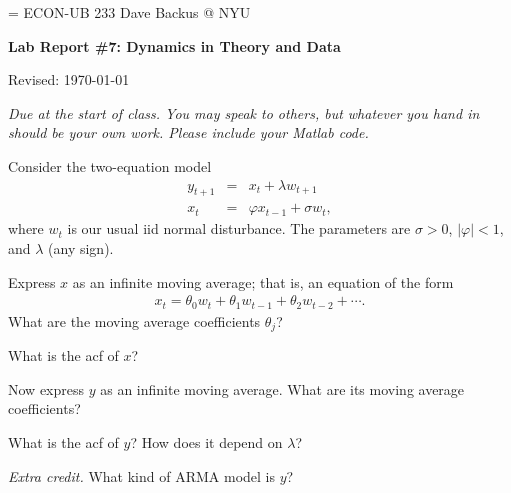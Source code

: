 \documentclass[11pt]{exam}
\begin{document}
\parskip=\bigskipamount
\parindent=0.0in
\thispagestyle{empty}
{\large ECON-UB 233 \hfill Dave Backus @ NYU}

\bigskip\bigskip
\centerline{\Large \bf Lab Report \#7:  Dynamics in Theory and Data}
\centerline{Revised: \today}

\bigskip
{\it Due at the start of class.
You may speak to others, but whatever you hand in should be your own work.
Please include your Matlab code.}


\begin{questions}
Consider the two-equation model
\begin{eqnarray*}
    y_{t+1}   &=&  x_t + \lambda w_{t+1} \\
    x_{t}     &=& \varphi x_{t-1} + \sigma w_{t}  ,
\end{eqnarray*}
where $w_t$ is our usual iid normal disturbance.
The parameters are $\sigma>0$, $| \varphi| < 1$, and $\lambda$ (any sign).

\begin{parts}
\item Express $x$ as an infinite moving average; that is, an equation of the form
\begin{eqnarray*}
    x_t = \theta_0 w_t + \theta_1 w_{t-1} + \theta_2 w_{t-2} + \cdots .
\end{eqnarray*}
What are the moving average coefficients $\theta_j$?
\item What is the acf of $x$?
\item Now express $y$ as an infinite moving average.
What are its moving average coefficients?
\item What is the acf of $y$?  How does it depend on $\lambda$?
\item {\it Extra credit.\/} 
What kind of ARMA model is $y$?
\end{parts}


\end{questions}
\end{document}
